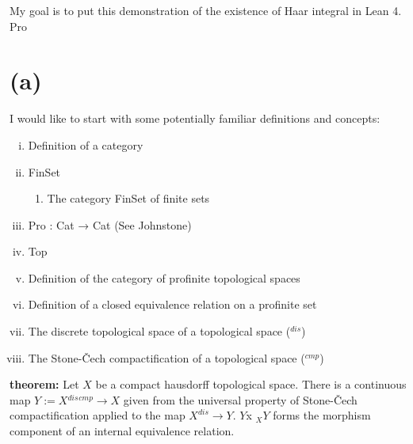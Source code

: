 \documentclass[13pt]{amsart}
\begin{document}
My goal is to put this demonstration of the existence of Haar integral in Lean 4.\\


Pro

\section{(a)}

I would like to start with some potentially familiar definitions and concepts:

\begin{enumerate}[(i)]
\item Definition of a category
\item FinSet
\begin{enumerate}
\item The category FinSet of finite sets 
\end{enumerate}
\item Pro : Cat → Cat (See Johnstone)
\item Top \iffalse
\item Definition of compact
\item Definition of Hausdorff
\item Definition of a cofiltered diagram
\item Definition of a cofiltered limit on objects
 \item Definition the category Pro C for a category C
\item The product of profinite sets is profinite and satisfies the universal property of product in profinite sets.
\item Definition of a $\texttt{Pro FinSet}$
\item Definition of a $\texttt{CH}$ the category of compact hausdorff topological spaces, a fully faithful subcategory of topological spaces  \fi
\item Definition of the category of profinite topological spaces
\item Definition of a closed equivalence relation on a profinite set
\item The discrete topological space of a topological space (${}^{dis}$)
\item The Stone-Čech compactification of a topological space (${}^{cmp}$)
\end{enumerate}

{\bf theorem:} Let $X$ be a compact hausdorff topological space. There is a continuous map $Y := X{}^{dis}{}^{cmp} \rightarrow X$ given from the universal property of Stone-Čech compactification applied to the map $X^{dis} \rightarrow Y$. $Y $x ${}_{X} Y$ forms the morphism component of an internal equivalence relation.\\
\end{document}
